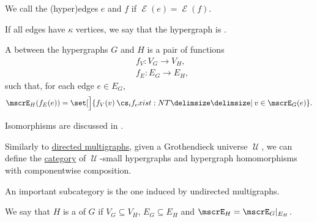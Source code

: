 \begin{definition}
\begin{thmenum}[resume=def:hypergraph]
    \mimprovised We call the (hyper)edges \( e \) and \( f \)  if \( \mscrE(e) = \mscrE(f) \).

     If all edges have \( \kappa \) vertices, we say that the hypergraph is .

     A  between the hypergraphs \( G \) and \( H \) is a pair of functions
    \begin{align*}
      &f_V: V_G \to V_H, \\
      &f_E: E_G \to E_H,
    \end{align*}
    such that, for each edge \( e \in E_G \),
    \begin{equation}\label{eq:def:hypergraph/homomorphism}
      \mscrE_H(f_E(e)) = \set[\Big]{ f_V(v) \given* v \in \mscrE_G(e) }.
    \end{equation}

    Isomorphisms are discussed in .

     Similarly to \hyperref[def:directed_multigraph]{directed multigraphs}, given a Grothendieck universe \( \mscrU \), we can define the \hyperref[def:category]{category} of \( \mscrU \)-small hypergraphs and hypergraph homomorphisms with componentwise composition.

    An important subcategory is the one induced by undirected multigraphs.

    \mimprovised We say that \( H \) is a  of \( G \) if \( V_G \subseteq V_H \), \( E_G \subseteq E_H \) and \( \mscrE_H = \mscrE_G\restr_{E_H} \).
  \end{thmenum}
\end{definition}

